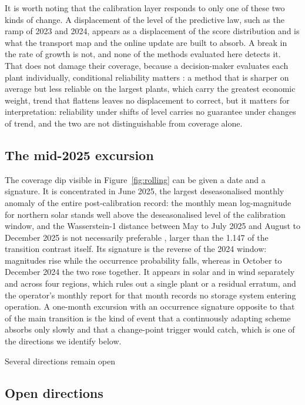 \documentclass[preprint,3p,times]{elsarticle}
\providecommand{\DIFaddtex}[1]{{\protect\color{blue} \sf #1}} %
\providecommand{\DIFdeltex}[1]{{\protect\color{red} \scriptsize #1}} %
\providecommand{\DIFaddbegin}{} %
\providecommand{\DIFaddend}{} %
\providecommand{\DIFdelbegin}{} %
\providecommand{\DIFdelend}{} %
\providecommand{\DIFadd}[1]{\texorpdfstring{\DIFaddtex{#1}}{#1}} %
\providecommand{\DIFdel}[1]{\texorpdfstring{\DIFdeltex{#1}}{}} %
\begin{document}
\DIFadd{It is worth noting that the calibration layer responds to only one of these two kinds of change. A displacement of the level of the predictive law, such as the ramp of 2023 and 2024, appears as a displacement of the score distribution and is what the transport map and the online update are built to absorb. A break in the rate of growth is not, and none of the methods evaluated here detects it. That does not damage their coverage}\DIFaddend , because a \DIFdelbegin \DIFdel{decision-maker evaluates each plant individually, conditional reliability matters : a method that is sharper on average but less reliable on the largest plants, which carry the greatest economic weight, }\DIFdelend \DIFaddbegin \DIFadd{trend that flattens leaves no displacement to correct, but it matters for interpretation: reliability under shifts of level carries no guarantee under changes of trend, and the two are not distinguishable from coverage alone.
}

\subsection{The mid-2025 excursion}

\DIFadd{The coverage dip visible in Figure~\ref{fig:rolling} can be given a date and a signature. It is concentrated in June 2025, the largest deseasonalised monthly anomaly of the entire post-calibration record: the monthly mean log-magnitude for northern solar stands well above the deseasonalised level of the calibration window, and the Wasserstein-1 distance between May to July 2025 and August to December 2025 }\DIFaddend is \DIFdelbegin \DIFdel{not necessarily preferable}\DIFdelend \DIFaddbegin \DIFadd{1.334, larger than the 1.147 of the transition contrast itself. Its signature is the reverse of the 2024 window: magnitudes rise while the occurrence probability falls, whereas in October to December 2024 the two rose together. It appears in solar and in wind separately and across four regions, which rules out a single plant or a residual erratum, and the operator's monthly report for that month records no storage system entering operation. A one-month excursion with an occurrence signature opposite to that of the main transition is the kind of event that a continuously adapting scheme absorbs only slowly and that a change-point trigger would catch, which is one of the directions we identify below}\DIFaddend .

\DIFdelbegin \DIFdel{Several directions remain open}\DIFdelend \DIFaddbegin \subsection{Open directions}
\end{document}
